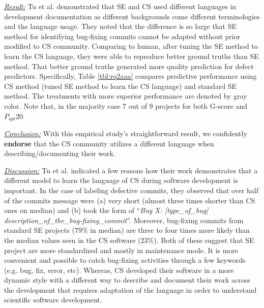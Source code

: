 \documentclass[sigconf,review,anonymous]{acmart}
\newenvironment{RQ}{\vspace{1mm}\begin{tcolorbox}[enhanced,width=3.4in,size=fbox,colback=red!5!white,drop shadow southwest,sharp corners]}{\end{tcolorbox}}
\begin{document}
\noindent \textit{\underline{Result:}} Tu et al. \cite{tu2019better} demonstrated that SE and CS used different languages in development documentation as different backgrounds come different terminologies and the language usage. They noted that the difference is so large that SE method for identifying bug-fixing commits cannot be adapted without prior modified to CS community. Comparing to human, after tuning the SE method to learn the CS language, they were able to reproduce better ground truths than SE method. That better ground truths generated more quality prediction for defect predictors. Specifically, Table \ref{tbl:rq2aaa} compares predictive performance using CS method (tuned SE method to learn the CS language) and standard SE method. The treatments with more superior performance are denoted by gray color. Note that,
in the majority case 7 out of 9 projects for both G-score and $P_{opt}$20. 


\begin{RQ}
\textit{\underline{Conclusion:}} With this empirical study's straightforward result, we confidently \textbf{endorse} that the CS community utilizes a different language when describing/documenting their work. 
\end{RQ} 

\noindent \textit{\underline{Discussion:}}  Tu et al. \cite{tu2019better} indicated a few reasons how their work demonstrates that a different model to learn the language of CS during software development is important. In the case of labeling defective commits, they observed that over half of the commits message were (a) very short (almost three times shorter than CS ones on median) and (b) took the form of
``\textit{Bug X: [type\_of\_bug] description\_of\_the\_bug-fixing\_commit}''. Moreover, bug-fixing commits from standard SE projects (79\% in median)
are three to four times more likely than the median values seen in the CS software (23\%). Both of these suggest that SE project are more standardized and mostly in maintenance mode. It is more convenient  and  possible  to  catch  bug-fixing activities through a few keywords (e.g. bug, fix, error, etc). Whereas, CS developed their software in a more dynamic style with a different way to describe and document their work across the development that requires adaptation of the language in order to understand scientific software development. 
\end{document}
